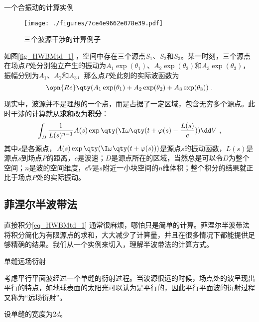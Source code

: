 \begin{example}{一个合振动的计算实例}

\begin{figure}[ht]
\centering
\texttt{[image: ./figures/7ce4e9662e078e39.pdf]}
\caption{三个波源干涉的计算例子} \label{fig_HWBMtd_1}
\end{figure}

如图\autoref{fig_HWBMtd_1} ，空间中存在三个源点$S_1$、$S_2$和$S_3$。某一时刻，三个源点在场点$P$处分别独立产生的振动为$A_1\exp(\theta_1)$、$A_2\exp(\theta_2)$和$A_3\exp(\theta_3)$，振幅分别为$A_1$、$A_2$和$A_3$，那么点$P$处此刻的实际波函数为
\begin{equation}
\opn{Re}\qty(A_1\exp(\theta_1)+A_2\exp(\theta_2)+A_3\exp(\theta_3))~. 
\end{equation}

\end{example}




现实中，波源并不是理想的一个点，而是占据了一定区域，包含无穷多个源点。此时干涉的计算就从\textbf{求和}改为\textbf{积分}：
\begin{equation}\label{eq_HWBMtd_1}
\int_D \frac{1}{L(s)^{n-1}}A(s)\exp\qty(\I\omega\qty(t+\varphi(s)-\frac{L(s)}{c}))\dd V~, 
\end{equation}
其中$s$是各源点，$A(s)\exp\qty(\I\omega\qty(t+\varphi(s)))$是源点$s$的振动函数，$L(s)$是源点$s$到场点$P$的距离，$c$是波速；$D$是源点所在的区域，当然总是可以令$D$为整个空间；$n$是波的空间维度，$\dd V$是$s$附近一小块空间的$n$维体积；整个积分的结果就正比于场点$P$处的实际振动。




\subsection{菲涅尔半波带法}


直接积分\autoref{eq_HWBMtd_1} 通常很麻烦，哪怕只是简单的计算。菲涅尔半波带法将积分简化为有限源点的求和，大大减少了计算量，并且在很多情况下都能提供足够精确的结果。我们从一个实例来切入，理解半波带法的计算方式。




\begin{example}{单缝远场衍射}

考虑平行平面波经过一个单缝的衍射过程。当波源很远的时候，场点处的波呈现出平行的特点，如地球表面的太阳光可以认为是平行的，因此平行平面波的衍射过程又称为“远场衍射”。

设单缝的宽度为$2d$。

\end{example}























